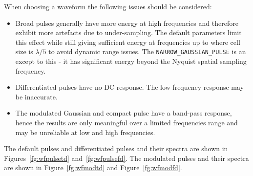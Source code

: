 \documentclass[onecolumn,a4paper]{article}
\numberwithin{equation}{section}
\begin{document}
When choosing a waveform the following issues should be considered:
\begin{itemize}
 \item Broad pulses generally have more energy at high frequencies and therefore exhibit
 more artefacts due to under-sampling. The default parameters limit
 this effect while still giving sufficient energy at frequencies up to where cell size
 is $\lambda/5$ to avoid dynamic range issues. The \texttt{NARROW\_GAUSSIAN\_PULSE} is an
 except to this - it has significant energy beyond the Nyquist spatial sampling frequency.
 \item Differentiated pulses have no DC response. The low frequency response may be inaccurate.
 \item The modulated Gaussian and compact pulse have a band-pass response, hence the
 results are only meaningful over a limited frequencies range and may be unreliable at low
 and high frequencies.
\end{itemize}

The default pulses and differentiated pulses and their spectra are shown in 
Figures~\ref{fg:wfpulsetd} and~\ref{fg:wfpulsefd}. The modulated pulses and 
their spectra are shown in Figure~\ref{fg:wfmodtd} and Figure~\ref{fg:wfmodfd}.
\end{document}
